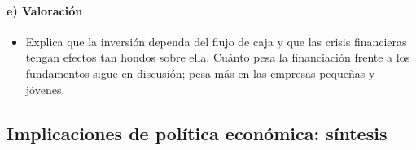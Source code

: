 \documentclass[11pt]{article}
\begin{document}
\paragraph{e) Valoración}

\begin{itemize}
\item Explica que la inversión dependa del flujo de caja y que las crisis financieras tengan efectos tan hondos sobre ella. Cuánto pesa la financiación frente a los fundamentos sigue en discusión; pesa más en las empresas pequeñas y jóvenes.
\end{itemize}

\subsection{Implicaciones de política económica: síntesis}\label{sec:implicaciones}
\end{document}

